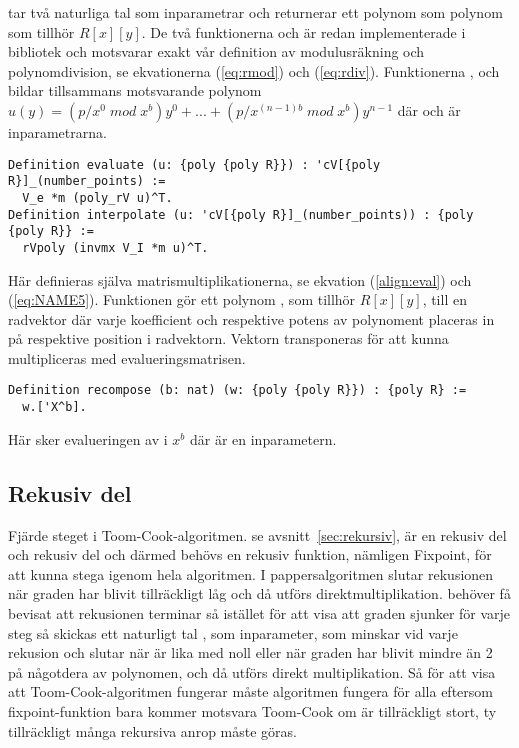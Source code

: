  tar två naturliga tal som inparametrar och returnerar ett polynom som
polynom som tillhör $R[x][y]$. De två funktionerna  och  är
redan implementerade i \ssr{} bibliotek och motsvarar exakt vår definition av
modulusräkning och polynomdivision, se ekvationerna (\ref{eq:rmod}) och
(\ref{eq:rdiv}). Funktionerna ,  och  bildar
tillsammans motsvarande polynom
$u(y)=(p/x^0\;mod\;x^b)y^0+...+(p/x^{(n-1)b}\;mod\;x^b)y^{n-1}$ där  och
 är inparametrarna.

\begin{lstlisting}
Definition evaluate (u: {poly {poly R}}) : 'cV[{poly R}]_(number_points) :=
  V_e *m (poly_rV u)^T.
Definition interpolate (u: 'cV[{poly R}]_(number_points)) : {poly {poly R}} :=
  rVpoly (invmx V_I *m u)^T.
\end{lstlisting}

Här definieras själva matrismultiplikationerna, se ekvation (\ref{align:eval})
och (\ref{eq:NAME5}). Funktionen  gör ett polynom , som
tillhör $R[x][y]$, till en radvektor där varje koefficient och respektive
potens av polynoment placeras in på respektive position i radvektorn. Vektorn
transponeras för att kunna multipliceras med evalueringsmatrisen.

\begin{lstlisting}
Definition recompose (b: nat) (w: {poly {poly R}}) : {poly R} :=
  w.['X^b].
\end{lstlisting}

Här sker evalueringen av  i $x^b$ där  är en inparametern.

\subsection{Rekusiv del}

Fjärde steget i Toom-Cook-algoritmen. se avsnitt~\ref{sec:rekursiv},  är en rekusiv del och
rekusiv del och därmed behövs en rekusiv funktion, nämligen Fixpoint, för att
kunna stega igenom hela algoritmen. I pappersalgoritmen slutar rekusionen när
graden har blivit tillräckligt låg och då utförs direktmultiplikation. \coq{}
behöver få bevisat att rekusionen terminar så istället för att visa att graden
sjunker för varje steg så skickas ett naturligt tal , som inparameter, som
minskar vid varje rekusion och slutar när  är lika med noll eller när
graden har blivit mindre än 2 på någotdera av polynomen, och då utförs direkt
multiplikation. Så för att visa att Toom-Cook-algoritmen fungerar måste
algoritmen fungera för alla  eftersom fixpoint-funktion bara kommer motsvara
Toom-Cook om  är tillräckligt stort, ty tillräckligt många rekursiva anrop
måste göras.


